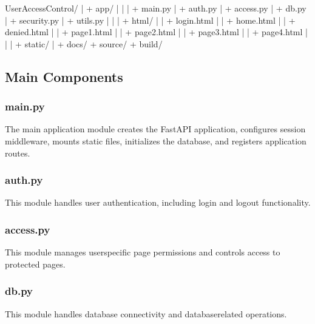 \documentclass[letterpaper,10pt,english]{sphinxmanual}
\begin{document}
\begin{sphinxVerbatim}[commandchars=\\\{\}]
UserAccessControl/
|
+\PYGZhy{}\PYGZhy{} app/
|   |
|   +\PYGZhy{}\PYGZhy{} main.py
|   +\PYGZhy{}\PYGZhy{} auth.py
|   +\PYGZhy{}\PYGZhy{} access.py
|   +\PYGZhy{}\PYGZhy{} db.py
|   +\PYGZhy{}\PYGZhy{} security.py
|   +\PYGZhy{}\PYGZhy{} utils.py
|   |
|   +\PYGZhy{}\PYGZhy{} html/
|   |   +\PYGZhy{}\PYGZhy{} login.html
|   |   +\PYGZhy{}\PYGZhy{} home.html
|   |   +\PYGZhy{}\PYGZhy{} denied.html
|   |   +\PYGZhy{}\PYGZhy{} page1.html
|   |   +\PYGZhy{}\PYGZhy{} page2.html
|   |   +\PYGZhy{}\PYGZhy{} page3.html
|   |   +\PYGZhy{}\PYGZhy{} page4.html
|   |
|   +\PYGZhy{}\PYGZhy{} static/
|
+\PYGZhy{}\PYGZhy{} docs/
    +\PYGZhy{}\PYGZhy{} source/
    +\PYGZhy{}\PYGZhy{} build/
\end{sphinxVerbatim}


\subsection{Main Components}
\label{\detokenize{architecture:main-components}}

\subsubsection{main.py}
\label{\detokenize{architecture:main-py}}
\sphinxAtStartPar
The main application module creates the FastAPI application, configures
session middleware, mounts static files, initializes the database, and
registers application routes.


\subsubsection{auth.py}
\label{\detokenize{architecture:auth-py}}
\sphinxAtStartPar
This module handles user authentication, including login and logout
functionality.


\subsubsection{access.py}
\label{\detokenize{architecture:access-py}}
\sphinxAtStartPar
This module manages user\sphinxhyphen{}specific page permissions and controls access
to protected pages.


\subsubsection{db.py}
\label{\detokenize{architecture:db-py}}
\sphinxAtStartPar
This module handles database connectivity and database\sphinxhyphen{}related operations.
\end{document}
